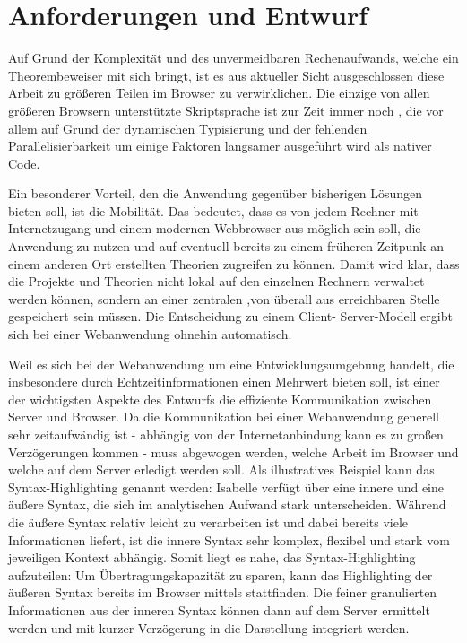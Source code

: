 \chapter{Anforderungen und Entwurf}
\label{sec:draft}

Auf Grund der Komplexität und des unvermeidbaren Rechenaufwands, welche ein Theorembeweiser mit sich
bringt, ist es aus aktueller Sicht ausgeschlossen diese Arbeit zu größeren Teilen im Browser zu
verwirklichen. Die einzige von allen größeren Browsern unterstützte Skriptsprache ist zur Zeit immer
noch , die vor allem auf Grund der dynamischen Typisierung und der fehlenden
Parallelisierbarkeit um einige Faktoren langsamer ausgeführt wird als nativer Code.

Ein besonderer Vorteil, den die Anwendung gegenüber bisherigen Lösungen bieten soll, ist die
Mobilität. Das bedeutet, dass es von jedem Rechner mit Internetzugang und einem modernen Webbrowser
aus möglich sein soll, die Anwendung zu nutzen und auf eventuell bereits zu einem früheren Zeitpunk
an einem anderen Ort erstellten Theorien zugreifen zu können. Damit wird klar, dass die Projekte und
Theorien nicht lokal auf den einzelnen Rechnern verwaltet werden können, sondern an einer zentralen
,von überall aus erreichbaren Stelle gespeichert sein müssen. Die Entscheidung zu einem Client-
Server-Modell ergibt sich bei einer Webanwendung ohnehin automatisch.

Weil es sich bei der Webanwendung um eine Entwicklungsumgebung handelt, die insbesondere durch
Echtzeitinformationen einen Mehrwert bieten soll, ist einer der wichtigsten Aspekte des Entwurfs
die effiziente Kommunikation zwischen Server und Browser. Da die Kommunikation bei einer
Webanwendung generell sehr zeitaufwändig ist - abhängig von der Internetanbindung kann es zu großen
Verzögerungen kommen - muss abgewogen werden, welche Arbeit im Browser und welche auf dem Server
erledigt werden soll. Als illustratives Beispiel kann das Syntax-Highlighting genannt werden:
Isabelle verfügt über eine innere und eine äußere Syntax, die sich im analytischen Aufwand stark
unterscheiden. Während die äußere Syntax relativ leicht zu verarbeiten ist und dabei bereits viele
Informationen liefert, ist die innere Syntax sehr komplex, flexibel und stark vom jeweiligen Kontext
abhängig. Somit liegt es nahe, das Syntax-Highlighting aufzuteilen: Um Übertragungskapazität zu
sparen, kann das Highlighting der äußeren Syntax bereits im Browser mittels  stattfinden. Die
feiner granulierten Informationen aus der inneren Syntax können dann auf dem Server ermittelt werden
und mit kurzer Verzögerung in die Darstellung integriert werden.



\clearpage



\clearpage

